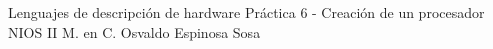 




	\pnormal
	{Lenguajes de descripción de hardware}
	{Práctica 6  - Creación de un procesador NIOS II}
	{M. en C. Osvaldo Espinosa Sosa}
	\tableofcontents
	
	\newpage 
	\newpage 
	\clearpage 
	\newpage 



